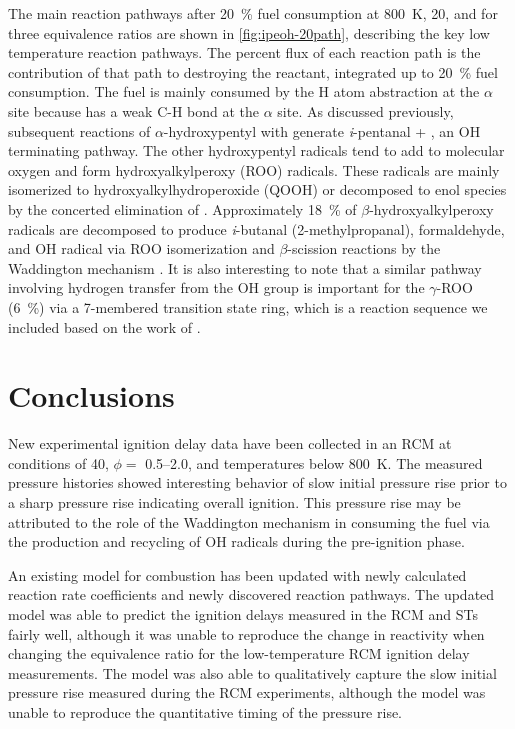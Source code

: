 \documentclass[../main.tex]{subfiles}
\begin{document}
The main \iPeOH{} reaction pathways after \SI{20}{\percent} fuel consumption at
\SI{800}{\kelvin}, \SI{20}{\atmosphere}, and for three equivalence
ratios are shown in \cref{fig:ipeoh-20path}, describing the key low
temperature reaction pathways. The percent flux of each reaction path
is the contribution of that path to destroying the reactant, integrated
up to \SI{20}{\percent} fuel consumption. The fuel is mainly consumed by
the H atom abstraction at the $\alpha$ site because \iPeOH{} has a weak
C-H bond at the $\alpha$ site. As discussed previously, subsequent
reactions of $\alpha$-hydroxypentyl with  generate \textit{i}-pentanal
+ , an OH terminating pathway. The other hydroxypentyl radicals tend
to add to molecular oxygen and form hydroxyalkylperoxy (ROO) radicals.
These radicals are mainly isomerized to hydroxyalkylhydroperoxide (QOOH)
or decomposed to enol species by the concerted elimination of . Approximately
\SI{18}{\percent} of $\beta$-hydroxyalkylperoxy radicals are decomposed to produce
\textit{i}-butanal (2-methylpropanal), formaldehyde, and OH radical via ROO
isomerization and $\beta$-scission reactions by the Waddington mechanism
\cite{Ray1973, Sway1983}. It is also interesting to note that a similar
pathway involving hydrogen transfer from the OH group is
important for the $\gamma$-ROO (\SI{6}{\percent}) via a 7-membered transition state
ring, which is a reaction sequence we included based on the work
of \textcite{Welz2012}.

\section{Conclusions}
\label{sec:ipeoh-conclusions}

New experimental ignition delay data have been collected in an RCM at
conditions of \SI{40}{\atmosphere}, $\phi=$ \numrange{0.5}{2.0}, and
temperatures below \SI{800}{\kelvin}. The measured pressure histories
showed interesting behavior of slow initial pressure rise prior to a
sharp pressure rise indicating overall ignition. This pressure rise
may be attributed to the role of the Waddington mechanism in consuming
the fuel via the production and recycling of OH radicals during the
pre-ignition phase.

An existing model \cite{Tsujimura2012} for \iPeOH{} combustion has been updated with newly
calculated reaction rate coefficients and newly discovered reaction
pathways. The updated model was able to predict the ignition
delays measured in the RCM and STs fairly well, although
it was unable to reproduce the change in reactivity when changing the
equivalence ratio for the low-temperature RCM ignition delay measurements.
The model was also able to qualitatively capture the slow initial pressure
rise measured during the RCM experiments, although the model was unable
to reproduce the quantitative timing of the pressure rise.
\end{document}
